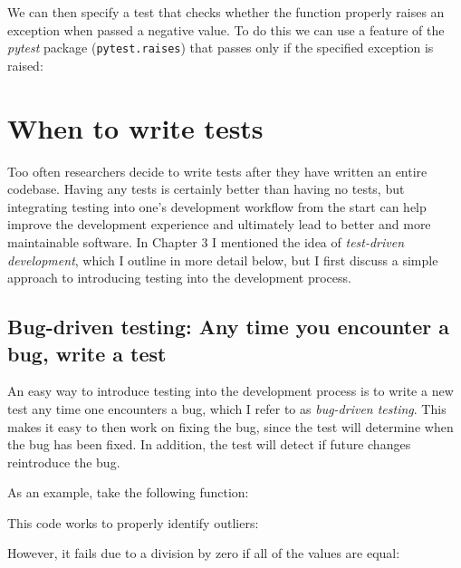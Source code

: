 

We can then specify a test that checks whether the function properly raises an exception when passed a negative value.
To do this we can use a feature of the \textit{pytest} package (\texttt{pytest.raises}) that passes only if the specified exception is raised:



\section{When to write tests}

Too often researchers decide to write tests after they have written an entire codebase.
Having any tests is certainly better than having no tests, but integrating testing into one's development workflow from the start can help improve the development experience and ultimately lead to better and more maintainable software.
In Chapter 3 I mentioned the idea of \textit{test-driven development}, which I outline in more detail below, but I first discuss a simple approach to introducing testing into the development process.

\subsection{Bug-driven testing: Any time you encounter a bug, write a test}

An easy way to introduce testing into the development process is to write a new test any time one encounters a bug, which I refer to as \textit{bug-driven testing}.
This makes it easy to then work on fixing the bug, since the test will determine when the bug has been fixed.
In addition, the test will detect if future changes reintroduce the bug.

As an example, take the following function:



This code works to properly identify outliers:



However, it fails due to a division by zero if all of the values are equal:



